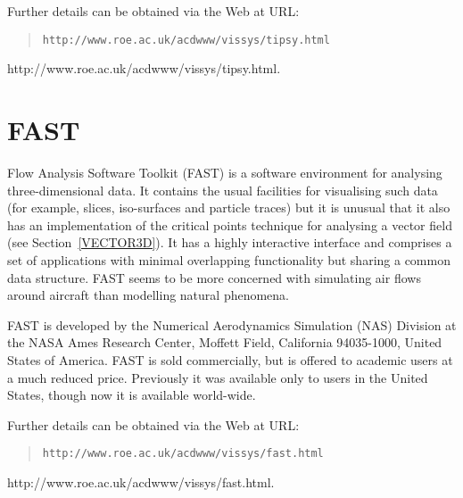 \begin{latexonly}
Further details can be obtained via the Web at URL:

\begin{quote}
{\tt http://www.roe.ac.uk/acdwww/vissys/tipsy.html}
\end{quote}
\end{latexonly}

\begin{htmlonly}
{http://www.roe.ac.uk/acdwww/vissys/tipsy.html}.
\end{htmlonly}


\section{FAST \label{FAST}  }

Flow Analysis Software Toolkit (FAST) is a software environment for
analysing three-dimensional data. It contains the usual facilities for
visualising such data (for example, slices, iso-surfaces and particle
traces) but it is unusual that it also has an implementation of the
critical points technique for analysing a vector field (see
Section~\ref{VECTOR3D}). It has a highly interactive interface and
comprises a set of applications with minimal overlapping functionality
but sharing a common data structure. FAST seems to be more concerned
with simulating air flows around aircraft than modelling natural
phenomena.

FAST is developed by the Numerical Aerodynamics Simulation (NAS)
Division at the NASA Ames Research Center, Moffett Field, California
94035-1000, United States of America. FAST is sold commercially, but is
offered to academic users at a much reduced price. Previously it was
available only to users in the United States, though now it is available
world-wide.

\begin{latexonly}
Further details can be obtained via the Web at URL:

\begin{quote}
{\tt http://www.roe.ac.uk/acdwww/vissys/fast.html}
\end{quote}
\end{latexonly}

\begin{htmlonly}
{http://www.roe.ac.uk/acdwww/vissys/fast.html}.
\end{htmlonly}



